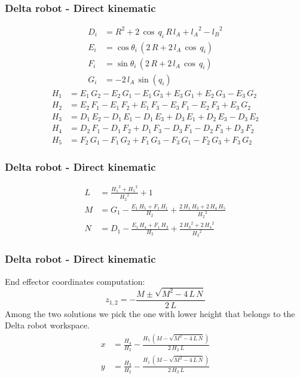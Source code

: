 \begin{frame}
	\frametitle{Delta robot - Direct kinematic}
	\begin{align}
		D_i &= R^2+2\,\cos\,q_{i}\,R\,l_{A}+{l_{A}}^2-{l_{B}}^2\\
		E_i &= \cos\theta _{i}\,\left(2\,R+2\,l_{A}\,\cos\,q_{i}\right)\\
		F_i &= \sin\theta _{i}\,\left(2\,R+2\,l_{A}\,\cos\,q_{i}\right)\\
		G_i &= -2\,l_{A}\,\sin\left(q_{i}\right)
	\end{align}
%
	\begin{align}
		H_1 &= E_{1}\,G_{2}-E_{2}\,G_{1}-E_{1}\,G_{3}+E_{3}\,G_{1}+E_{2}\,G_{3}-E_{3}\,G_{2}\\
		H_2 &= E_{2}\,F_{1}-E_{1}\,F_{2}+E_{1}\,F_{3}-E_{3}\,F_{1}-E_{2}\,F_{3}+E_{3}\,G_{2}\\
		H_3 &= D_{1}\,E_{2}-D_{1}\,E_{1}-D_{1}\,E_{3}+D_{3}\,E_{1}+D_{2}\,E_{3}-D_{3}\,E_{2}\\
		H_4 &= D_{2}\,F_{1}-D_{1}\,F_{2}+D_{1}\,F_{3}-D_{3}\,F_{1}-D_{2}\,F_{3}+D_{3}\,F_{2}\\
		H_5 &= F_{2}\,G_{1}-F_{1}\,G_{2}+F_{1}\,G_{3}-F_{3}\,G_{1}-F_{2}\,G_{3}+F_{3}\,G_{2}
	\end{align}
\end{frame}
%
\begin{frame}
\frametitle{Delta robot - Direct kinematic}
	\begin{align}
		L &= \frac{{H_{1}}^2+{H_{5}}^2}{{H_{2}}^2}+1\\
		M &= G_{1}-\frac{E_{1}\,H_{5}+F_{1}\,H_{1}}{H_{2}}+\frac{2\,H_{1}\,H_{3}+2\,H_{4}\,H_{5}}{{H_{2}}^2}\\
		N &= D_{1}-\frac{E_{1}\,H_{4}+F_{1}\,H_{3}}{H_{2}}+\frac{2\,{H_{3}}^2+2\,{H_{4}}^2}{{H_{2}}^2}
	\end{align}
\end{frame}
%
\begin{frame}
\frametitle{Delta robot - Direct kinematic}
End effector coordinates computation:
	\begin{equation}
		z_{1,2} = -\frac{M \pm \sqrt{M^2-4\,L\,N}}{2\,L}
	\end{equation}
	Among the two solutions we pick the one with lower height that belongs to the Delta robot workspace.
	\begin{align}
		x &= \frac{H_{4}}{H_{2}}-\frac{H_{5}\,\left(M-\sqrt{M^2-4\,L\,N}\right)}{2\,H_{2}\,L}\\
		y &= \frac{H_{3}}{H_{2}}-\frac{H_{1}\,\left(M-\sqrt{M^2-4\,L\,N}\right)}{2\,H_{2}\,L}
	\end{align}
\end{frame}
%

